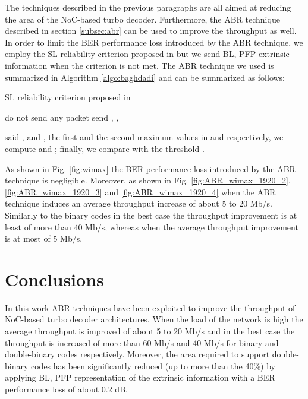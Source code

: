 \documentclass[10pt,twocolumn,journal]{IEEEtran}
\begin{document}
The techniques described in the previous paragraphs are all aimed at reducing the area of the NoC-based turbo 
decoder. Furthermore, the ABR technique described in section \ref{subsec:abr} can be used to improve the throughput 
as well. In order to limit the BER performance loss introduced by the ABR technique, we employ the SL
reliability criterion proposed in \cite{baghdadi_EL06} but we send BL, PFP extrinsic information
when the criterion is not met. The ABR technique we used is summarized in Algorithm \ref{algo:baghdadi} and can be summarized as follows:
\begin{algorithm}
  \caption{SL reliability criterion proposed in \cite{baghdadi_EL06} }
  \label{algo:baghdadi}
  \begin{algorithmic}[1]
    \STATE  
    \STATE  
    \STATE 
    \STATE  
    \STATE  
    \STATE  
    \STATE 
    \IF{}
    \STATE do not send any packet
    \ELSE
    \STATE send , , 
    \ENDIF
  \end{algorithmic}
\end{algorithm}
said ,  and 
,  
the first and the second maximum values in  and  respectively, we 
compute  and 
; finally, we compare 
 with the threshold .

As shown in Fig. \ref{fig:wimax} the BER performance loss introduced by the ABR technique is negligible. 
Moreover, as shown in Fig. \ref{fig:ABR_wimax_1920_2}, \ref{fig:ABR_wimax_1920_3} and \ref{fig:ABR_wimax_1920_4} 
when  the ABR technique induces an average throughput increase of about 5 to 20 Mb/s. 
Similarly to the binary codes in the best case the throughput improvement is at least of more than 40 Mb/s, whereas 
when  the average throughput improvement is at most of 5 Mb/s.

\section{Conclusions}
\label{sec:concl}
In this work ABR techniques have been exploited to improve the throughput of NoC-based turbo decoder architectures. 
When the load of the network is high the average throughput is improved of about 5 to 20 Mb/s and in the best case 
the throughput is increased of more than 60 Mb/s and 40 Mb/s for binary and double-binary codes respectively. 
Moreover, the area required to support double-binary codes has been 
significantly reduced (up to more than the 40\%) by applying BL, PFP representation of the extrinsic information with 
a BER performance loss of about 0.2 dB.



\end{document}
